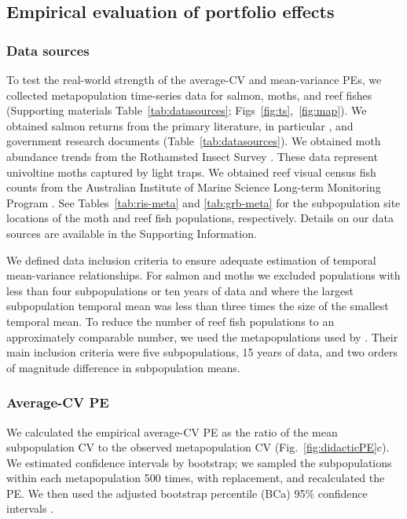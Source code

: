 \subsection{Empirical evaluation of portfolio effects}

\subsubsection{Data sources}

To test the real-world strength of the average-CV and mean-variance PEs, we
collected metapopulation time-series data for salmon, moths, and reef fishes
(Supporting materials Table~\ref{tab:datasources}; Figs~\ref{fig:ts},~\ref{fig:map}).
We obtained salmon returns from the primary
literature, in particular \citet{dorner2008}, and government research
documents (Table~\ref{tab:datasources}). We obtained moth abundance trends from
the Rothamsted Insect Survey \citep{conrad2004}. These data represent
univoltine moths captured by light traps. We obtained reef visual census fish
counts from the Australian Institute of Marine Science Long-term Monitoring
Program \citep{sweatman2008}. See Tables~\ref{tab:ris-meta} and
\ref{tab:grb-meta} for the subpopulation site locations of the moth and reef
fish populations, respectively. Details on our data sources are available in the
Supporting Information.

We defined data inclusion criteria to ensure adequate estimation of temporal
mean-variance relationships. For salmon and moths we excluded populations
with less than four subpopulations or ten years of data and where the largest
subpopulation temporal mean was less than three times the size of the smallest
temporal mean. To reduce the number of reef fish populations to an
approximately comparable number, we used the metapopulations used by
\citet{mellin2010}. Their main inclusion criteria were five
subpopulations, 15 years of data, and two orders of magnitude difference in
subpopulation means.

\subsubsection{Average-CV PE}

We calculated the empirical average-CV PE as the ratio of the mean subpopulation
CV to the observed metapopulation CV (Fig.~\ref{fig:didacticPE}c). We estimated
confidence intervals by bootstrap; we sampled the subpopulations within each
metapopulation 500 times, with replacement, and recalculated the PE. We then
used the adjusted bootstrap percentile (BCa) 95\% confidence intervals
\citep{canty2012}.

